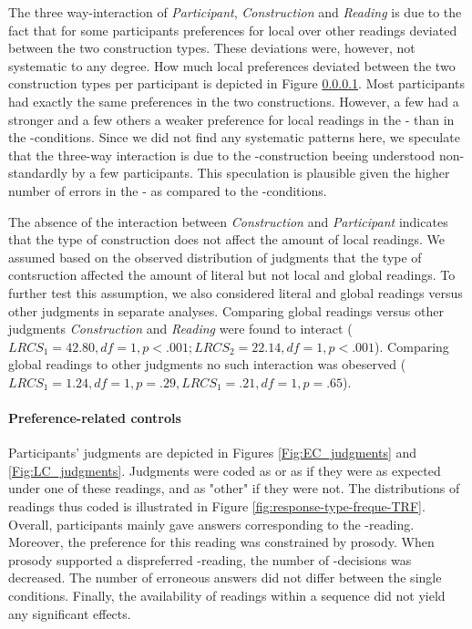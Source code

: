 \documentclass[fleqn,reqno,10pt,draft]{article}
\newcommand{\as}{\acro{as}}
\renewcommand{\es}{\acro{es}}
\newcommand{\lc}{\acro{lc}}
\newcommand{\ec}{\acro{ec}}
\begin{document}
The three way-interaction of {\it Participant}, {\it Construction} and
{\it Reading} is due to the fact that for some participants
preferences for local over other readings deviated between the two
construction types. These deviations were, however, not systematic to
any degree. How much local preferences deviated between the two
construction types per participant is depicted in Figure \ref{}. Most
participants had exactly the same preferences in the two
constructions. However, a few had a stronger and a few others a weaker
preference for local readings in the \es- than in the
\as-conditions. Since we did not find any systematic patterns
here, we speculate that the three-way interaction is due to the
\es-construction beeing understood non-standardly by a
few participants. This speculation is plausible given the higher
number of errors in the \es- as compared to the \as-conditions.

The absence of the interaction between {\it Construction} and {\it
  Participant} indicates that the type of construction does not affect
the amount of local readings. We assumed based on the observed
distribution of judgments that the type of contsruction affected the
amount of literal but not local and global readings. To further test
this assumption, we also considered literal and global readings versus
other judgments in separate analyses. Comparing global readings versus
other judgments {\it Construction} and {\it Reading} were found to
interact ($LRCS_1=42.80, df= 1, p<.001; LRCS_2=22.14, df= 1,
p<.001$). Comparing global readings to other judgments no such
interaction was obeserved ($LRCS_1=1.24, df= 1, p=.29, LRCS_1=.21, df=
1, p=.65$).


\paragraph{Preference-related controls}

Participants' judgments are depicted in Figures \ref{Fig:EC_judgments} and 
\ref{Fig:LC_judgments}. Judgments were coded as \ec or as \lc if they were as expected
under one of these readings, and as "other" if they were not. The distributions 
of readings thus coded is illustrated in Figure \ref{fig:response-type-freque-TRF}. 
Overall, participants mainly gave answers corresponding to the \lc-reading. Moreover,
the preference for this reading was constrained by prosody. When prosody supported 
a dispreferred \ec-reading, the number of \lc-decisions was decreased. The number 
of erroneous answers did not differ between the single conditions. Finally, the
availability of readings within a sequence did not yield any significant effects.
\end{document}

